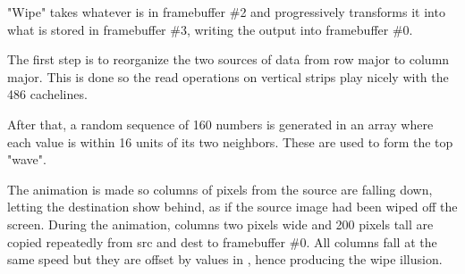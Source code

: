 \par
"Wipe" takes whatever is in framebuffer \#2 and progressively transforms it into what is stored in framebuffer \#3, writing the output into framebuffer \#0.\\%
\par
The first step is to reorganize the two sources of data from row major to column major. This is done so the read operations on vertical strips play nicely with the 486 cachelines.\\
\par
{}
\par
After that, a random sequence of 160 numbers is generated in an array  where each value is within 16 units of its two neighbors. These are used to form the top "wave".\\
\par The animation is made so columns of pixels from the source are falling down, letting the destination show behind, as if the source image had been wiped off the screen. During the animation, columns two pixels wide and 200 pixels tall are copied repeatedly from src and dest to framebuffer \#0. All columns fall at the same speed but they are offset by values in , hence producing the wipe illusion.





